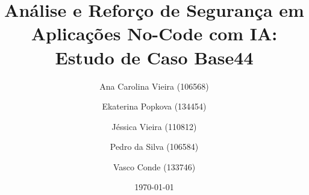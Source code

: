 \documentclass[a4paper, 12pt]{article}
\title{Análise e Reforço de Segurança em Aplicações No-Code com IA: Estudo de Caso Base44}
\author{
Ana Carolina Vieira (106568) \and
Ekaterina Popkova (134454) \and
Jéssica Vieira (110812) \and
Pedro da Silva (106584) \and
Vasco Conde (133746)
}
\date{\today}
\begin{document}






\renewcommand{\contentsname}{Índice}
\tableofcontents


\listoffigures


















{}


\end{document}
